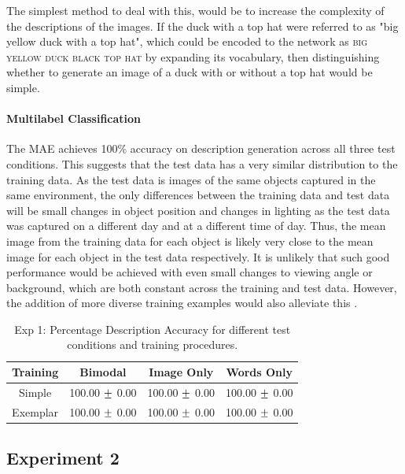 The simplest method to deal with this, would be to increase the complexity of the descriptions of the images. If the duck with a top hat were referred to as "big yellow duck with a top hat", which could be encoded to the network as \textsc{big yellow duck black top hat} by expanding its vocabulary, then distinguishing whether to generate an image of a duck with or without a top hat would be simple.


\paragraph{Multilabel Classification}

The \ac{MAE} achieves 100\% accuracy on description generation across all three test conditions. This suggests that the test data has a very similar distribution to the training data. As the test data is images of the same objects captured in the same environment, the only differences between the training data and test data will be small changes in object position and  changes in lighting as the test data was captured on a different day and at a different time of day. Thus, the mean image from the training data for each object is likely very close to the mean image for each object in the test data respectively. It is unlikely that such good performance would be achieved with even small changes to viewing angle or background, which are both constant across the training and test data. However, the addition of more diverse training examples would also alleviate this \cite{keller2016analysis, keller}.


\begin{table}[h!]
\centering
	\begin{tabular}{|c|c|c|c|}
	\hline
\textbf{Training }	 & 	\textbf{Bimodal} & \textbf{Image Only} 	& 	\textbf{Words Only} \\ \hline
Simple & 100.00 $\mypm$ 0.00 & 100.00 $\mypm$ 0.00 & 100.00 $\mypm$ 0.00 \\ \hline
Exemplar & 100.00 $\mypm$ 0.00 & 100.00 $\mypm$ 0.00 & 100.00 $\mypm$ 0.00 \\ \hline
	\end{tabular}
\caption{Exp 1: Percentage Description Accuracy for different test conditions and training procedures.}
\label{tab:6_res_exp1_acc}
\end{table}


\subsection{Experiment 2}

